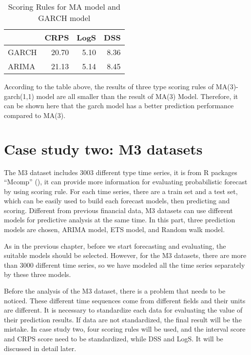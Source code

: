 \documentclass{monashthesis}
\theoremstyle{definition}
\theoremstyle{definition}
\theoremstyle{definition}
\theoremstyle{remark}
\begin{document}
\begin{table}

\caption{\label{tab:table2}Scoring Rules for MA model and GARCH model}
\centering
\begin{tabular}[t]{lrrr}
\toprule
  & CRPS & LogS & DSS\\
\midrule
GARCH & 20.70 & 5.10 & 8.36\\
ARIMA & 21.13 & 5.14 & 8.45\\
\bottomrule
\end{tabular}
\end{table}

According to the table above, the results of three type scoring rules of
MA(3)-garch(1,1) model are all smaller than the result of MA(3) Model.
Therefore, it can be shown here that the garch model has a better
prediction performance compared to MA(3).

\chapter{Case study two: M3 datasets}\label{case-study-two-m3-datasets}

The M3 dataset includes 3003 different type time series, it is from R
packages ``Mcomp'' (\textcite{RH182}), it can provide more information
for evaluating probabilistic forecast by using scoring rule. For each
time series, there are a train set and a test set, which can be easily
used to build each forecast models, then predicting and scoring.
Different from previous financial data, M3 datasets can use different
models for predictive analysis at the same time. In this part, three
prediction models are chosen, ARIMA model, ETS model, and Random walk
model.

As in the previous chapter, before we start forecasting and evaluating,
the suitable models should be selected. However, for the M3 datasets,
there are more than 3000 different time series, so we have modeled all
the time series separately by these three models.

Before the analysis of the M3 dataset, there is a problem that needs to
be noticed. These different time sequences come from different fields
and their units are different. It is necessary to standardize each data
for evaluating the value of their prediction results. If data are not
standardized, the final result will be the mistake. In case study two,
four scoring rules will be used, and the interval score and CRPS score
need to be standardized, while DSS and LogS. It will be discussed in
detail later.
\end{document}
